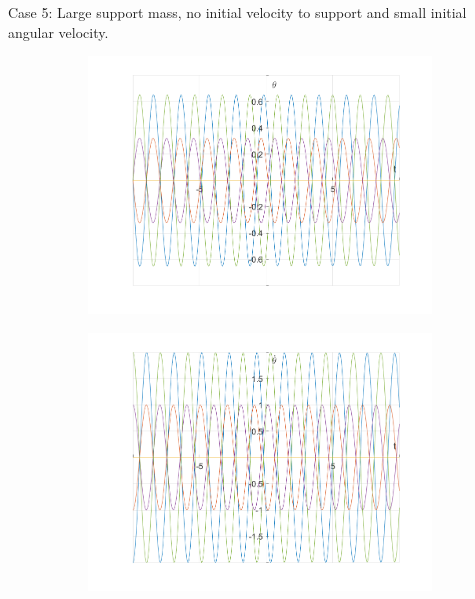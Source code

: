 \documentclass{article}
\begin{document}
	Case 5:
	Large support mass, no initial velocity to support and small initial angular velocity.
	\begin{figure}[h!]
		\centering
		\begin{subfigure}[b]{0.48\linewidth}
			\includegraphics[width=\linewidth]{./SmallOscillations/S5/F1.png}
		\end{subfigure}
		\begin{subfigure}[b]{0.48\linewidth}
			\includegraphics[width=\linewidth]{./SmallOscillations/S5/F2.png}
		\end{subfigure}
	\end{figure}
	
\end{document}
